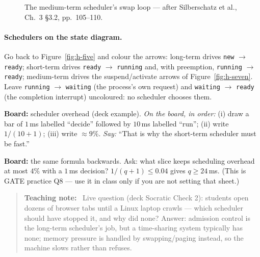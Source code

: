\documentclass[11pt]{article}
\newenvironment{teachingaside}{\begin{quote}\small\color{primary-gold}\textbf{Teaching note:}\ }{\end{quote}}
\begin{document}
\begin{figure}[h]
\centering
{}
\caption{The medium-term scheduler's swap loop --- after Silberschatz et al., Ch.~3 \S3.2, pp.~105--110.}
\label{fig:h-swap}
\end{figure}

\paragraph{Schedulers on the state diagram.} Go back to Figure~\ref{fig:h-five} and colour the arrows: long-term drives \texttt{new} $\to$ \texttt{ready}; short-term drives \texttt{ready} $\to$ \texttt{running} and, with preemption, \texttt{running} $\to$ \texttt{ready}; medium-term drives the suspend/activate arrows of Figure~\ref{fig:h-seven}. Leave \texttt{running} $\to$ \texttt{waiting} (the process's own request) and \texttt{waiting} $\to$ \texttt{ready} (the completion interrupt) uncoloured: no scheduler chooses them.

\textbf{Board:} scheduler overhead (deck example). \emph{On the board, in order:} (i) draw a bar of $1$\,ms labelled ``decide'' followed by $10$\,ms labelled ``run''; (ii) write $1/(10+1)$; (iii) write $\approx 9\%$. \emph{Say:} ``That is why the short-term scheduler must be fast.''

\textbf{Board:} the same formula backwards. Ask: what slice keeps scheduling overhead at most $4\%$ with a $1$\,ms decision? $1/(q+1) \le 0.04$ gives $q \ge 24$\,ms. (This is GATE practice Q8 --- use it in class only if you are not setting that sheet.)

\begin{teachingaside}
Live question (deck Socratic Check 2): students open dozens of browser tabs until a Linux laptop crawls --- which scheduler should have stopped it, and why did none? Answer: admission control is the long-term scheduler's job, but a time-sharing system typically has none; memory pressure is handled by swapping/paging instead, so the machine slows rather than refuses.
\end{teachingaside}
\end{document}

